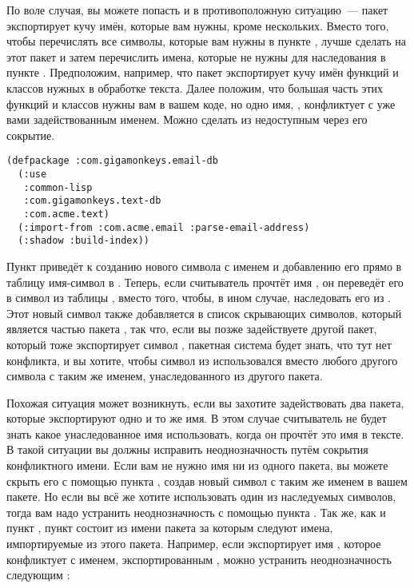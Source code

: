 По воле случая, вы можете попасть и в противоположную ситуацию~--- пакет экспортирует кучу
имён, которые вам нужны, кроме нескольких. Вместо того, чтобы перечислять все символы,
которые вам нужны в пункте , лучше сделать  на этот пакет и
затем перечислить имена, которые не нужны для наследования в пункте
. Предположим, например, что пакет  экспортирует кучу
имён функций и классов нужных в обработке текста. Далее положим, что большая часть этих
функций и классов нужны вам в вашем коде, но одно имя, , конфликтует с
уже вами задействованным именем.  Можно сделать  из 
недоступным через его сокрытие.

\begin{lstlisting}
(defpackage :com.gigamonkeys.email-db
  (:use
   :common-lisp
   :com.gigamonkeys.text-db
   :com.acme.text)
  (:import-from :com.acme.email :parse-email-address)
  (:shadow :build-index))
\end{lstlisting}

Пункт  приведёт к созданию нового символа с именем  и
добавлению его прямо в таблицу имя-символ в . Теперь, если
считыватель прочтёт имя , он переведёт его в символ из таблицы
, вместо того, чтобы, в ином случае, наследовать его из
. Этот новый символ также добавляется в список скрывающих символов,
который является частью пакета , так что, если вы позже
задействуете другой пакет, который тоже экспортирует символ , пакетная
система будет знать, что тут нет конфликта, и вы хотите, чтобы символ из
 использовался вместо любого другого символа с таким же
именем, унаследованного из другого пакета.

Похожая ситуация может возникнуть, если вы захотите задействовать два пакета, которые
экспортируют одно и то же имя. В этом случае считыватель не будет знать какое
унаследованное имя использовать, когда он прочтёт это имя в тексте. В такой ситуации вы
должны исправить неоднозначность путём сокрытия конфликтного имени. Если вам не нужно имя
ни из одного пакета, вы можете скрыть его с помощью пункта , создав новый
символ с таким же именем в вашем пакете. Но если вы всё же хотите использовать один из
наследуемых символов, тогда вам надо устранить неоднозначность с помощью пункта
. Так же, как и пункт , пункт
 состоит из имени пакета за которым следуют имена,
импортируемые из этого пакета. Например, если  экспортирует имя
, которое конфликтует с именем, экспортированным
, можно устранить неоднозначность следующим
:

